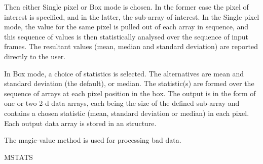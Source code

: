 {\begin{manroutinedescription}
  Then either Single pixel or Box mode is chosen. In the former
  case the pixel of interest is specified, and in the latter, the
  sub-array of interest. In the Single pixel mode, the value for the
  same pixel is pulled out of each array in sequence, and this
  sequence of values is then statistically analysed over the
  sequence of input frames. The resultant values (mean, median
  and standard deviation) are reported directly to the user.

  In Box mode, a choice of statistics is selected.  The alternatives
  are mean and standard deviation (the default), or median. The
  statistic(s) are formed over the sequence of arrays at each pixel
  position in the box. The output is in the form of one or two 2-d
  data arrays, each being the size of the defined sub-array and
  contains a chosen statistic (mean, standard deviation or median)
  in each pixel. Each output data array is stored in an {}
  structure.

  The magic-value method is used for processing bad data.

  MSTATS


\end{manroutinedescription}}
